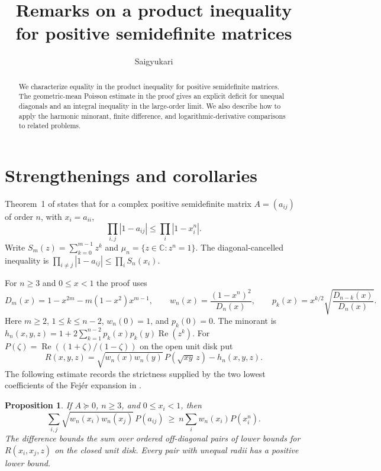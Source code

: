 \documentclass[10pt,twoside,reqno]{amsart}
\title[Remarks on a PSD product inequality]{Remarks on a product inequality for positive semidefinite matrices}
\author{Saigyukari}
\date{}
\newtheorem{proposition}[theorem]{Proposition}
\numberwithin{equation}{section}
\newcommand{\C}{\mathbb C}
\newcommand{\re}{\operatorname{Re}}
\begin{document}
\begin{abstract}
We characterize equality in the product inequality for positive semidefinite
matrices. The geometric-mean Poisson estimate in the proof gives an explicit
deficit for unequal diagonals and an integral inequality in the large-order
limit. We also describe how to apply the harmonic minorant, finite difference,
and logarithmic-derivative comparisons to related problems.
\end{abstract}
\maketitle

\section{Strengthenings and corollaries}

Theorem~1 of \cite{main} states that for a complex positive semidefinite matrix
\(A=(a_{ij})\) of order \(n\), with \(x_i=a_{ii}\),
\begin{equation}\label{eq:main}
 \prod_{i,j}|1-a_{ij}|\le \prod_i|1-x_i^n|.
\end{equation}
Write \(S_m(z)=\sum_{k=0}^{m-1}z^k\) and \(\mu_n=\{z\in\C:z^n=1\}\).
The diagonal-cancelled inequality is
\(\prod_{i\ne j}|1-a_{ij}|\le\prod_i S_n(x_i)\).

For \(n\ge3\) and \(0\le x<1\) the proof uses
\begin{equation}\label{eq:weight}
 D_m(x)=1-x^{2m}-m(1-x^2)x^{m-1},\qquad
 w_n(x)=\frac{(1-x^n)^2}{D_n(x)},\qquad
 p_k(x)=x^{k/2}\sqrt{\frac{D_{n-k}(x)}{D_n(x)}} .
\end{equation}
Here \(m\ge2\), \(1\le k\le n-2\), \(w_n(0)=1\), and \(p_k(0)=0\).
The minorant is \(h_n(x,y,z)=1+2\sum_{k=1}^{n-2}p_k(x)p_k(y)\re(z^k)\).
For \(P(\zeta)=\re((1+\zeta)/(1-\zeta))\) on the open unit disk put
\[
 R(x,y,z)=\sqrt{w_n(x)w_n(y)}\,P(\sqrt{xy}\,z)-h_n(x,y,z).
\]
The following estimate records the strictness supplied by the two lowest
coefficients of the Fejér expansion in \cite{main}.

\begin{proposition}\label{prop:poisson}
If \(A\succeq0\), \(n\ge3\), and \(0\le x_i<1\), then
\begin{equation}\label{eq:poisson}
 \sum_{i,j}\sqrt{w_n(x_i)w_n(x_j)}\,P(a_{ij})
 \ \ge\ n\sum_i w_n(x_i)P(x_i^n).
\end{equation}
The difference bounds the sum over ordered off-diagonal pairs of lower bounds
for \(R(x_i,x_j,z)\) on the closed unit disk. Every pair with unequal radii
has a positive lower bound.
\end{proposition}
\end{document}
